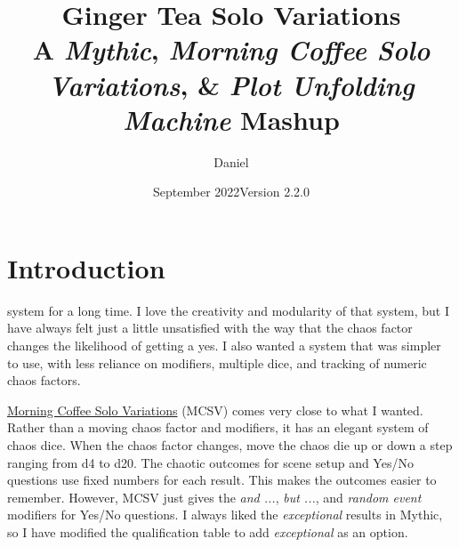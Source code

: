 

\title{
\Huge{Ginger Tea Solo Variations}
\\ \small{A \emph{Mythic}, \emph{Morning Coffee Solo Variations}, \& \emph{Plot Unfolding Machine} Mashup}
}
\date{September 2022\newline{}Version 2.2.0}
\author{Daniel}


\frontmatter
\maketitle


\mainmatter

\section{Introduction}
system for a long time. I love the creativity and modularity of that system,
but I have always felt just a little unsatisfied with the way that the chaos
factor changes the likelihood of getting a yes. I also wanted a system
that was simpler to use, with less reliance on modifiers, multiple dice, and
tracking of numeric chaos factors.

\href{https://aleaiactandaest.blogspot.com/p/downloads.html}{Morning Coffee Solo
Variations} (MCSV) comes very close to what I wanted. Rather than a moving chaos
factor and modifiers, it has an elegant system of chaos dice. When the chaos
factor changes, move the chaos die up or down a step ranging from d4 to d20. The
chaotic outcomes for scene setup and Yes/No questions use fixed numbers for each
result. This makes the outcomes easier to remember. However, MCSV just gives the
\emph{and ...}, \emph{but ...}, and \emph{random event} modifiers for Yes/No
questions. I always liked the \emph{exceptional} results in Mythic, so I have
modified the qualification table to add \emph{exceptional} as an option.

